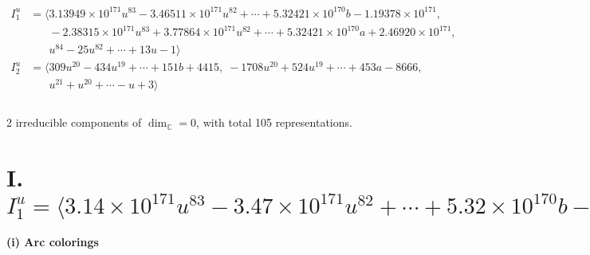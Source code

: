 \documentclass[1p]{elsarticle_modified}
\theoremstyle{definition}
\begin{document}
\begin{align*}
I^u_{1}&=\langle 
3.13949\times10^{171} u^{83}-3.46511\times10^{171} u^{82}+\cdots+5.32421\times10^{170} b-1.19378\times10^{171},\\
\phantom{I^u_{1}}&\phantom{= \langle  }-2.38315\times10^{171} u^{83}+3.77864\times10^{171} u^{82}+\cdots+5.32421\times10^{170} a+2.46920\times10^{171},\\
\phantom{I^u_{1}}&\phantom{= \langle  }u^{84}-25 u^{82}+\cdots+13 u-1\rangle \\
I^u_{2}&=\langle 
309 u^{20}-434 u^{19}+\cdots+151 b+4415,\;-1708 u^{20}+524 u^{19}+\cdots+453 a-8666,\\
\phantom{I^u_{2}}&\phantom{= \langle  }u^{21}+u^{20}+\cdots- u+3\rangle \\
\\
\end{align*}
\raggedright * 2 irreducible components of $\dim_{\mathbb{C}}=0$, with total 105 representations.\\
\newpage
\renewcommand{\arraystretch}{1}
\centering \section*{I. $I^u_{1}= \langle 3.14\times10^{171} u^{83}-3.47\times10^{171} u^{82}+\cdots+5.32\times10^{170} b-1.19\times10^{171},\;-2.38\times10^{171} u^{83}+3.78\times10^{171} u^{82}+\cdots+5.32\times10^{170} a+2.47\times10^{171},\;u^{84}-25 u^{82}+\cdots+13 u-1 \rangle$}
\flushleft \textbf{(i) Arc colorings}\\
\end{document}
